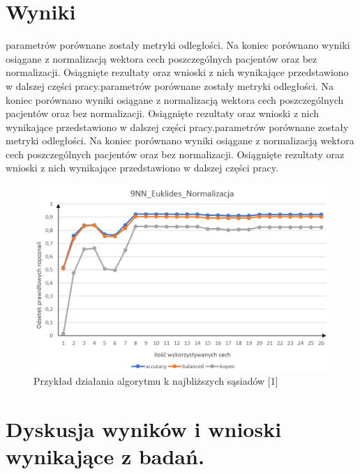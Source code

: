 \documentclass[12pt]{article}
\begin{document}
\section{Wyniki}
\newpage
parametrów porównane zostały metryki odległości. Na koniec porównano wyniki osiągane z normalizacją wektora cech poszczególnych pacjentów oraz bez normalizacji. Osiągnięte rezultaty oraz wnioski z nich wynikające przedstawiono w dalszej części pracy.parametrów porównane zostały metryki odległości. Na koniec porównano wyniki osiągane z normalizacją wektora cech poszczególnych pacjentów oraz bez normalizacji. Osiągnięte rezultaty oraz wnioski z nich wynikające przedstawiono w dalszej części pracy.parametrów porównane zostały metryki odległości. Na koniec porównano wyniki osiągane z normalizacją wektora cech poszczególnych pacjentów oraz bez normalizacji. Osiągnięte rezultaty oraz wnioski z nich wynikające przedstawiono w dalszej części pracy.
\begin{figure}[H]
	\centering
		\includegraphics[scale=0.7]{images/metrics/test.png}
	\caption{Przykład działania algorytmu k najbliższych sąsiadów [1]}
\end{figure}




\section{Dyskusja wyników i wnioski wynikające z badań.}
\end{document}
